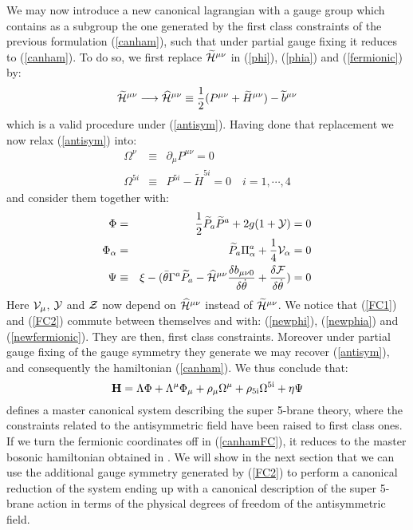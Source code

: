 \documentclass[a4paper,12pt]{article}
\def\CH{\widetilde{\cal{H}}}
\def\HCH{\widehat{\cal{H}}}
\def\btheta{\bar{\theta}}
\def\CF{\cal{F}}
\def\wp{\widetilde{P}}
\def\CV{\cal{V}}
\def\CY{\cal{Y}}
\def\CZ{\cal{Z}}
\begin{document}
We may now introduce a new canonical lagrangian with a gauge group
which contains as a subgroup the one generated by the first class
constraints of the previous formulation (\ref{canham}), such that
under partial gauge fixing it reduces to (\ref{canham}). To do so,
we first replace ${\CH}^{\mu\nu}$ in (\ref{phi}), (\ref{phia}) and
(\ref{fermionic}) by:
\begin{equation}\label{}
{\CH}^{\mu\nu}\longrightarrow\widehat{\cal{H}}^{\mu\nu}\equiv{1\over
2}(P^{\mu\nu}+\widetilde{H}^{\mu\nu})-\widetilde{b}^{\mu\nu}
\end{equation}
which is a valid procedure under (\ref{antisym}). Having done that
replacement we now relax (\ref{antisym}) into:
\begin{eqnarray}
\Omega^\nu&\equiv&\partial_\mu P^{\mu\nu}=0\label{FC1}\\
\Omega^{5i}&\equiv &P^{5i}-\widetilde{H}^{5i}=0\quad
i=1,\cdots,4\label{FC2}
\end{eqnarray}
and consider them together with:
\begin{eqnarray} {\Phi}
&=&{1\over 2}\wp_a\wp^a+2g(1+{\CY})=0\label{newphi}\\
{\Phi}_\alpha
&=&\wp_a\Pi^a_\alpha+\frac{1}{4}{\CV}_\alpha=0\label{newphia}\\
\Psi &\equiv &\xi-(\btheta\Gamma^a
\wp_a-{\HCH^{\mu\nu}}\frac{\delta
b_{\mu\nu0}}{\delta\dot{\theta}}+\frac{\delta
{\CF}}{\delta\dot{\theta}})=0\label{newfermionic}
\end{eqnarray}
Here ${\CV}_\mu$, $\CY$ and $\CZ$ now depend on ${\HCH^{\mu\nu}}$
instead of ${\CH}^{\mu\nu}$. We notice that (\ref{FC1}) and
(\ref{FC2}) commute between themselves and with: (\ref{newphi}),
(\ref{newphia}) and (\ref{newfermionic}). They are then, first
class constraints. Moreover under partial gauge fixing of the
gauge symmetry they generate we may recover (\ref{antisym}), and
consequently the hamiltonian (\ref{canham}). We thus conclude
that:
\begin{equation}\label{canhamFC}
\rm{\bf{H}}=\Lambda{\Phi}+\Lambda^\mu{\Phi}_\mu+\rho_{\mu}\Omega^{\mu}+\rho_{5i}\Omega^{5i}+\eta\Psi
\end{equation}
defines a master canonical system describing the super 5-brane
theory, where the constraints related to the antisymmetric field
have been raised to first class ones. If we turn  the fermionic
coordinates off in (\ref{canhamFC}), it  reduces to the master
bosonic hamiltonian obtained in \cite{DeCastro:2001gp}. We will
show in the next section that we can use the additional gauge
symmetry generated by (\ref{FC2}) to perform a canonical reduction
of the system ending up with a canonical description of the super
5-brane action in terms of the physical degrees of freedom of the
antisymmetric field.
\end{document}
